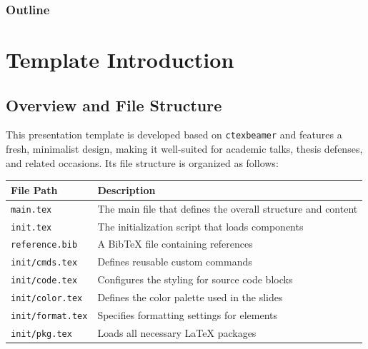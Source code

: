\documentclass[8pt]{beamer}
\begin{document}
\begin{frame}
    \frametitle{Outline}
    \setlength{\parskip}{0.2em}
    \tableofcontents
\end{frame}

\section{Template Introduction}
  
\makesection

\subsection{Overview and File Structure}

\begin{frame}{\insertsection}{\insertsubsection}

    This presentation template is developed based on \lstinline|ctexbeamer| and features a fresh, minimalist design, making it well-suited for academic talks, thesis defenses, and related occasions. Its file structure is organized as follows:

    \begin{table}
        \renewcommand{\arraystretch}{1.5}
        \centering
        \begin{tabular}{ll}
            \toprule
            File Path & Description \\
            \midrule
            \lstinline|main.tex| & The main file that defines the overall structure and content \\
            \lstinline|init.tex| & The initialization script that loads components \\
            \lstinline|reference.bib| & A BibTeX file containing references \\
            \lstinline|init/cmds.tex| & Defines reusable custom commands \\
            \lstinline|init/code.tex| & Configures the styling for source code blocks \\
            \lstinline|init/color.tex| & Defines the color palette used in the slides \\
            \lstinline|init/format.tex| & Specifies formatting settings for elements \\
            \lstinline|init/pkg.tex| & Loads all necessary LaTeX packages \\
            \bottomrule
        \end{tabular}
    \end{table}

\end{frame}
\end{document}
